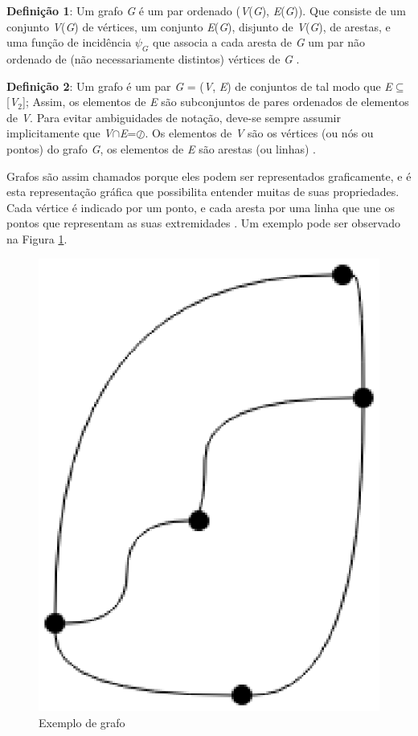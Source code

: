 \textbf{Definição 1}: Um grafo \textit{G} é um par ordenado (\textit{V}(\textit{G}), \textit{E}(\textit{G})). Que consiste de um conjunto \textit{V}(\textit{G}) de vértices, um conjunto \textit{E}(\textit{G}), disjunto de \textit{V}(\textit{G}), de arestas, e uma função de incidência $\psi_G$ que associa a cada aresta de \textit{G} um par não ordenado de (não necessariamente distintos) vértices de \textit{G} \cite{Bondy:2007}.

\textbf{Definição 2}: Um grafo é um par \textit{G} = (\textit{V}, \textit{E}) de conjuntos de tal modo que \textit{E}$\subseteq$[\textit{V}$_2$]; Assim, os elementos de \textit{E} são subconjuntos de pares ordenados de elementos de \textit{V}. Para evitar ambiguidades de notação, deve-se sempre assumir implicitamente que \textit{V}$\cap$\textit{E}=$\oslash$. Os elementos de \textit{V} são os vértices (ou nós ou pontos) do grafo \textit{G}, os elementos de \textit{E} são arestas (ou linhas) \cite{Diestel:1997}.

Grafos são assim chamados porque eles podem ser representados graficamente, e é esta representação gráfica que possibilita entender muitas de suas propriedades. Cada vértice é indicado por um ponto, e cada aresta por uma linha que une os pontos que representam as suas extremidades \cite{Bondy:2007}. Um exemplo pode ser observado na Figura \ref{exemplo_grafo}.

\begin{figure}[!h]
	\centering
	\includegraphics[scale=0.3]{figuras/capitulo2/exemplo_grafo.eps}
	\caption[Exemplo de grafo]{Exemplo de grafo \cite{Bondy:2007}}
	\label{exemplo_grafo}
\end{figure}

